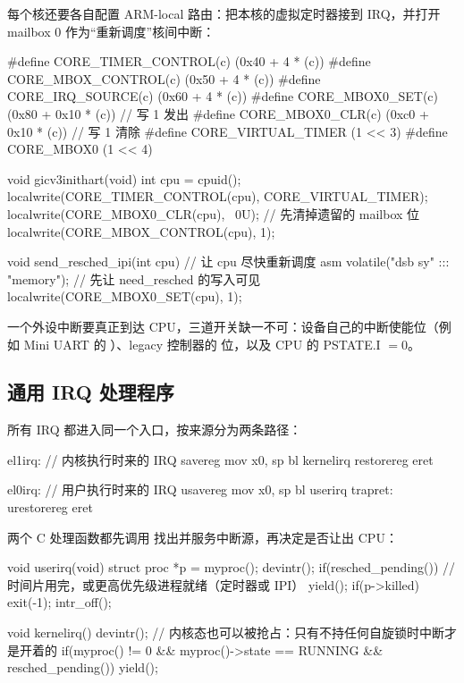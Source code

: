 每个核还要各自配置 ARM-local 路由：把本核的虚拟定时器接到 IRQ，并打开 mailbox 0 作为“重新调度”核间中断：

\begin{ccode}
#define CORE_TIMER_CONTROL(c) (0x40 + 4 * (c))
#define CORE_MBOX_CONTROL(c)  (0x50 + 4 * (c))
#define CORE_IRQ_SOURCE(c)    (0x60 + 4 * (c))
#define CORE_MBOX0_SET(c)     (0x80 + 0x10 * (c))   // 写 1 发出
#define CORE_MBOX0_CLR(c)     (0xc0 + 0x10 * (c))   // 写 1 清除
#define CORE_VIRTUAL_TIMER    (1 << 3)
#define CORE_MBOX0            (1 << 4)

void gicv3inithart(void)
{
  int cpu = cpuid();
  localwrite(CORE_TIMER_CONTROL(cpu), CORE_VIRTUAL_TIMER);
  localwrite(CORE_MBOX0_CLR(cpu), ~0U);     // 先清掉遗留的 mailbox 位
  localwrite(CORE_MBOX_CONTROL(cpu), 1);
}

void send_resched_ipi(int cpu)              // 让 cpu 尽快重新调度
{
  asm volatile("dsb sy" ::: "memory");      // 先让 need_resched 的写入可见
  localwrite(CORE_MBOX0_SET(cpu), 1);
}
\end{ccode}

一个外设中断要真正到达 CPU，三道开关缺一不可：设备自己的中断使能位（例如 Mini UART 的 ）、legacy 控制器的  位，以及 CPU 的 PSTATE.I $=0$。

\subsection{通用 IRQ 处理程序}

所有 IRQ 都进入同一个入口，按来源分为两条路径：

\begin{asmcode}
el1irq:                    // 内核执行时来的 IRQ
        savereg
        mov x0, sp
        bl kernelirq
        restorereg
        eret

el0irq:                    // 用户执行时来的 IRQ
        usavereg
        mov x0, sp
        bl userirq
trapret:
        urestorereg
        eret
\end{asmcode}

两个 C 处理函数都先调用  找出并服务中断源，再决定是否让出 CPU：

\begin{ccode}
void userirq(void)
{
  struct proc *p = myproc();
  devintr();
  if(resched_pending())      // 时间片用完，或更高优先级进程就绪（定时器或 IPI）
    yield();
  if(p->killed)
    exit(-1);
  intr_off();
}

void kernelirq()
{
  devintr();
  // 内核态也可以被抢占：只有不持任何自旋锁时中断才是开着的
  if(myproc() != 0 && myproc()->state == RUNNING && resched_pending())
    yield();
}
\end{ccode}


